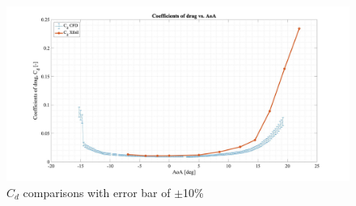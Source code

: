 \begin{figure}[H]
\centering
    \includegraphics[width=\textwidth]{error_bar4.jpg}
    \caption{$C_d$ comparisons with error bar of $\pm$10\%}
    \label{fig:error_bar4}
\end{figure}


